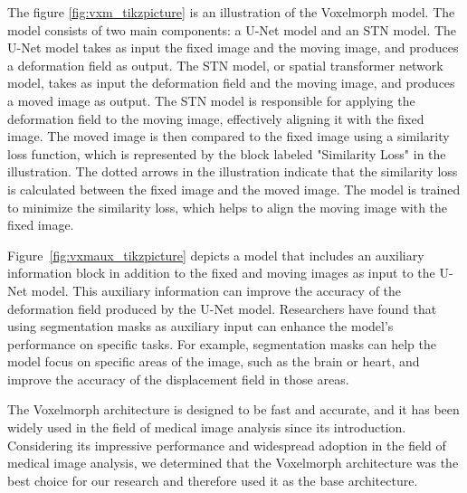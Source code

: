 \documentclass{report}
\begin{document}
	The figure \ref{fig:vxm_tikzpicture} is an illustration of the Voxelmorph model. The model consists of two main components: a U-Net model and an STN model. The U-Net model takes as input the fixed image and the moving image, and produces a deformation field as output. The STN model, or spatial transformer network model, takes as input the deformation field and the moving image, and produces a moved image as output. The STN model is responsible for applying the deformation field to the moving image, effectively aligning it with the fixed image. The moved image is then compared to the fixed image using a similarity loss function, which is represented by the block labeled "Similarity Loss" in the illustration. The dotted arrows in the illustration indicate that the similarity loss is calculated between the fixed image and the moved image. The model is trained to minimize the similarity loss, which helps to align the moving image with the fixed image.
	
	Figure~\ref{fig:vxmaux_tikzpicture} depicts a model that includes an auxiliary information block in addition to the fixed and moving images as input to the U-Net model. This auxiliary information can improve the accuracy of the deformation field produced by the U-Net model. Researchers have found that using segmentation masks as auxiliary input can enhance the model's performance on specific tasks. For example, segmentation masks can help the model focus on specific areas of the image, such as the brain or heart, and improve the accuracy of the displacement field in those areas.
	
	The Voxelmorph architecture is designed to be fast and accurate, and it has been widely used in the field of medical image analysis since its introduction. Considering its impressive performance and widespread adoption in the field of medical image analysis, we determined that the Voxelmorph architecture was the best choice for our research and therefore used it as the base architecture.
	
\end{document}
